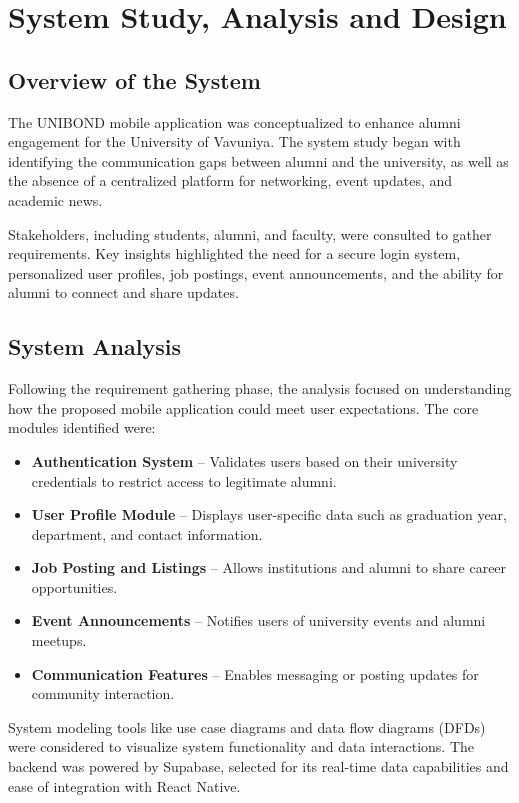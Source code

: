 \documentclass{report}
\begin{document}
\chapter{System Study, Analysis and Design}

\section{Overview of the System}

The UNIBOND mobile application was conceptualized to enhance alumni engagement for the University of Vavuniya. The system study began with identifying the communication gaps between alumni and the university, as well as the absence of a centralized platform for networking, event updates, and academic news.

Stakeholders, including students, alumni, and faculty, were consulted to gather requirements. Key insights highlighted the need for a secure login system, personalized user profiles, job postings, event announcements, and the ability for alumni to connect and share updates.

\section{System Analysis}

Following the requirement gathering phase, the analysis focused on understanding how the proposed mobile application could meet user expectations. The core modules identified were:

\begin{itemize}
    \item \textbf{Authentication System} – Validates users based on their university credentials to restrict access to legitimate alumni.
    \item \textbf{User Profile Module} – Displays user-specific data such as graduation year, department, and contact information.
    \item \textbf{Job Posting and Listings} – Allows institutions and alumni to share career opportunities.
    \item \textbf{Event Announcements} – Notifies users of university events and alumni meetups.
    \item \textbf{Communication Features} – Enables messaging or posting updates for community interaction.
\end{itemize}

System modeling tools like use case diagrams and data flow diagrams (DFDs) were considered to visualize system functionality and data interactions. The backend was powered by Supabase, selected for its real-time data capabilities and ease of integration with React Native.
\end{document}
